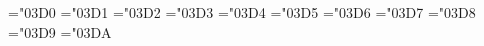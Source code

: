 %
%

\iflucida

\def\neq{\mathrel{\fam\arfam\mathchar"7094}}


\def\big#1{{\hbox{$\left#1\vbox to8.20\p@{}\right.\n@space$}}}
\def\Big#1{{\hbox{$\left#1\vbox to10.80\p@{}\right.\n@space$}}}
\def\bigg#1{{\hbox{$\left#1\vbox to13.42\p@{}\right.\n@space$}}}
\def\Bigg#1{{\hbox{$\left#1\vbox to16.03\p@{}\right.\n@space$}}}
\def\biggg#1{{\hbox{$\left#1\vbox to17.72\p@{}\right.\n@space$}}}
\def\Biggg#1{{\hbox{$\left#1\vbox to21.25\p@{}\right.\n@space$}}}
\def\n@space{\nulldelimiterspace\z@ \m@th}


\def\bigggl{\mathopen\biggg}
\def\bigggr{\mathclose\biggg}
\def\Bigggl{\mathopen\Biggg}
\def\Bigggr{\mathclose\Biggg}



\mathchardef\Gamma="03D0
\mathchardef\Delta="03D1
\mathchardef\Theta="03D2
\mathchardef\Lambda="03D3
\mathchardef\Xi="03D4
\mathchardef\Pi="03D5
\mathchardef\Sigma="03D6
\mathchardef\Upsilon="03D7
\mathchardef\Phi="03D8
\mathchardef\Psi="03D9
\mathchardef\Omega="03DA

\def\dot{\mathaccent"7005 }

\def\TeX{T\kern-.18em\lower.4ex\hbox{E}\kern-.1emX}


